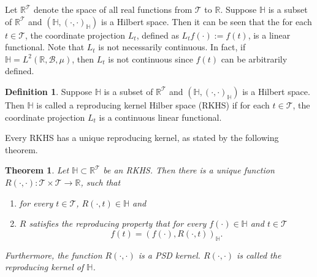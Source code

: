 \documentclass[11pt]{article}
\theoremstyle{plain}
\newtheorem{theorem}{\quad\quad Theorem}
\theoremstyle{definition}
\newtheorem{definition}{\quad\quad Definition}
\theoremstyle{remark}
\begin{document}
Let $\mathbb{R}^{\mathcal{T}}$ denote the space of all real functions from $\mathcal{T}$ to $\mathbb{R}$.
    Suppose $\mathbb{H}$ is a subset of $\mathbb{R}^{\mathcal{T}}$ and $(\mathbb{H},(\cdot,\cdot)_{\mathbb H})$ is a Hilbert space.
    Then it can be seen that the for each $t\in \mathcal{T}$, the coordinate projection $L_t$, defined as $L_t f(\cdot) :=f(t)$, is a linear functional.
    Note that $L_t$ is not necessarily continuous.
    In fact, if $\mathbb H = L^2(\mathbb{R},\mathcal B, \mu)$, then $L_t$ is not continuous since $f(t)$ can be arbitrarily defined.
\begin{definition}
    Suppose $\mathbb{H}$ is a subset of $\mathbb{R}^{\mathcal{T}}$ and $(\mathbb{H},(\cdot,\cdot)_{\mathbb H})$ is a Hilbert space.
    Then $\mathbb H$ is called a reproducing kernel Hilber space (RKHS) if for each $t\in \mathcal{T}$, the coordinate projection $L_t$ is a continuous linear functional.
\end{definition}

Every RKHS has a unique reproducing kernel, as stated by the following theorem.
\begin{theorem}
    Let $\mathbb H \subset \mathbb R^\mathcal T$ be an RKHS. Then there is a unique function $R(\cdot,\cdot): \mathcal T \times \mathcal T \to \mathbb R$, such that 
    \begin{enumerate}
        \item 
            for every $t\in \mathcal T$, $R(\cdot,t)\in \mathbb H$ and
        \item
            $R$ satisfies the reproducing property that for every $f(\cdot) \in \mathbb H$ and $t\in \mathcal T$
            \begin{equation*}
                f(t)=(f(\cdot), R(\cdot, t))_{\mathbb H}.
            \end{equation*}
    \end{enumerate}
    Furthermore, the function $R(\cdot,\cdot)$ is a PSD kernel.
    $R(\cdot,\cdot)$ is called the \emph{reproducing kernel} of $\mathbb H$.
\end{theorem}
\end{document}
